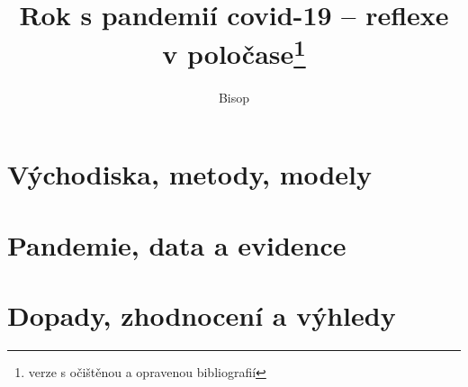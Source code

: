 \documentclass{book}
\begin{document}
%
%


\title{Rok s pandemií covid-19 -- reflexe v poločase\footnote{verze s očištěnou a opravenou bibliografií}}
\author{Bisop}
\maketitle


%




\part{Východiska, metody, modely}







\part{Pandemie, data a evidence}











\part{Dopady, zhodnocení a výhledy}









%
% 



\printbibliography
\tableofcontents
\end{document}
